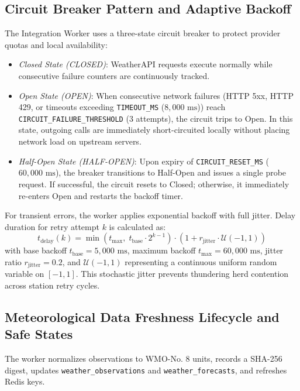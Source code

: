 \subsection{Circuit Breaker Pattern and Adaptive Backoff}
The Integration Worker uses a three-state circuit breaker to protect provider quotas and local availability:
\begin{itemize}
    \item[-] \textit{Closed State (CLOSED)}: WeatherAPI requests execute normally while consecutive failure counters are continuously tracked.
    \item[-] \textit{Open State (OPEN)}: When consecutive network failures (HTTP 5xx, HTTP 429, or timeouts exceeding \texttt{TIMEOUT\_MS} ($8,000\text{ ms}$)) reach \texttt{CIRCUIT\_FAILURE\_}\allowbreak\texttt{THRESHOLD} ($3$ attempts), the circuit trips to Open. In this state, outgoing calls are immediately short-circuited locally without placing network load on upstream servers.
    \item[-] \textit{Half-Open State (HALF-OPEN)}: Upon expiry of \texttt{CIRCUIT\_RESET\_MS} ($60,000\text{ ms}$), the breaker transitions to Half-Open and issues a single probe request. If successful, the circuit resets to Closed; otherwise, it immediately re-enters Open and restarts the backoff timer.
\end{itemize}

For transient errors, the worker applies exponential backoff with full jitter. Delay duration for retry attempt $k$ is calculated as:
\begin{equation}
\label{eq:backoff_jitter_en}
t_{\text{delay}}(k) = \min\left(t_{\max}, \; t_{\text{base}} \cdot 2^{k-1}\right) \cdot \left(1 + r_{\text{jitter}} \cdot \mathcal{U}(-1, 1)\right)
\end{equation}
with base backoff $t_{\text{base}} = 5,000\text{ ms}$, maximum backoff $t_{\max} = 60,000\text{ ms}$, jitter ratio $r_{\text{jitter}} = 0.2$, and $\mathcal{U}(-1, 1)$ representing a continuous uniform random variable on $[-1, 1]$. This stochastic jitter prevents thundering herd contention across station retry cycles.

\subsection{Meteorological Data Freshness Lifecycle and Safe States}
The worker normalizes observations to WMO-No. 8 units, records a SHA-256 digest, updates \texttt{weather\_observations} and \texttt{weather\_forecasts}, and refreshes Redis keys.

